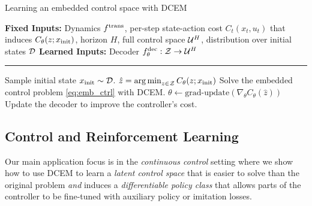 \documentclass{article}
\begin{document}
\begin{algorithm*}[t]
  \caption{Learning an embedded control space with DCEM}
\label{alg:embed}
\begin{algorithmic}
  \State \textbf{Fixed Inputs:} Dynamics $f^{\mathrm{trans}}$,
  per-step state-action cost $C_t(x_t, u_t)$ that induces $C_\theta(z; x_{\rm init})$,
  horizon $H$,
  full control space ${\mathcal{U}}^H$, distribution over initial states ${\mathcal{D}}$
  \State \textbf{Learned Inputs:} Decoder $f^{\mathrm{dec}}_\theta: {\mathcal{Z}} \rightarrow {\mathcal{U}}^H$
  \vspace{1mm}\hrule\vspace{1mm}
  \State Sample initial state $x_{\rm init}\sim {\mathcal{D}}$.
  \State $\hat z = \operatorname*{arg\,min}_{z\in {\mathcal{Z}}} C_\theta(z; x_{\rm init})$
  \Comment Solve the embedded control problem \cref{eq:emb_ctrl}
  with DCEM.
  \State $\theta \leftarrow \text{grad-update}(\nabla_\theta C_\theta(\hat z))$
  \Comment Update the decoder to improve the controller's cost.
  \EndWhile
\end{algorithmic}
\end{algorithm*}


\subsection{Control and Reinforcement Learning}
\label{sec:app:ctrl}

Our main application focus is in the \emph{continuous control} setting
where we show how to use DCEM to learn a \emph{latent control space} that
is easier to solve than the original problem \emph{and} induces
a \emph{differentiable policy class} that allows parts of the controller
to be fine-tuned with auxiliary policy or imitation losses.
\end{document}
